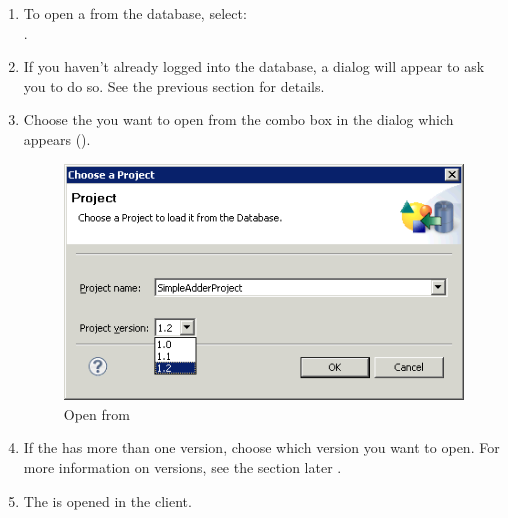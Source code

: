 

\begin{enumerate}
\item To open a \gdproject{} from the database, select:\\
. 
\item If you haven't already logged into the database, a dialog will appear to ask you to do so.  See the previous section  for details. 
\item Choose the \gdproject{} you want to open from the combo box in the dialog which appears (). 

\begin{figure}
\includegraphics{Tasks/Projects/PS/loadfromdb}
\caption{Open \gdproject{} from \gddb{}}
\label{loadfromdb}
\end{figure}

\item If the \gdproject{} has more than one version, choose which version you want to open. For more information on \gdproject{} versions, see the section later . 
\item The \gdproject{} is opened in the client. 
\end{enumerate}



  
